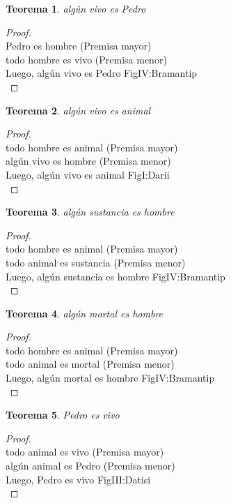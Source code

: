 ﻿\documentclass[12pt]{book}
\newtheorem{theorem}{Teorema}[chapter]
\newtheorem{proof}{Demostración}
\begin{document}
\begin{theorem}
algún vivo es Pedro
\label{th: 42}
\end{theorem}\begin{proof}\\Pedro es hombre	 (Premisa mayor) \\todo hombre es vivo	 (Premisa menor) \\Luego, algún vivo es Pedro	FigIV:Bramantip \\ \end{proof}
\begin{theorem}
algún vivo es animal
\label{th: 43}
\end{theorem}\begin{proof}\\todo hombre es animal	 (Premisa mayor) \\algún vivo es hombre	 (Premisa menor) \\Luego, algún vivo es animal	FigI:Darii \\ \end{proof}
\begin{theorem}
algún sustancia es hombre
\label{th: 44}
\end{theorem}\begin{proof}\\todo hombre es animal	 (Premisa mayor) \\todo animal es sustancia	 (Premisa menor) \\Luego, algún sustancia es hombre	FigIV:Bramantip \\ \end{proof}
\begin{theorem}
algún mortal es hombre
\label{th: 45}
\end{theorem}\begin{proof}\\todo hombre es animal	 (Premisa mayor) \\todo animal es mortal	 (Premisa menor) \\Luego, algún mortal es hombre	FigIV:Bramantip \\ \end{proof}
\begin{theorem}
Pedro es vivo
\label{th: 46}
\end{theorem}\begin{proof}\\todo animal es vivo	 (Premisa mayor) \\algún animal es Pedro	 (Premisa menor) \\Luego, Pedro es vivo	FigIII:Datisi \\ \end{proof}
\end{document}
